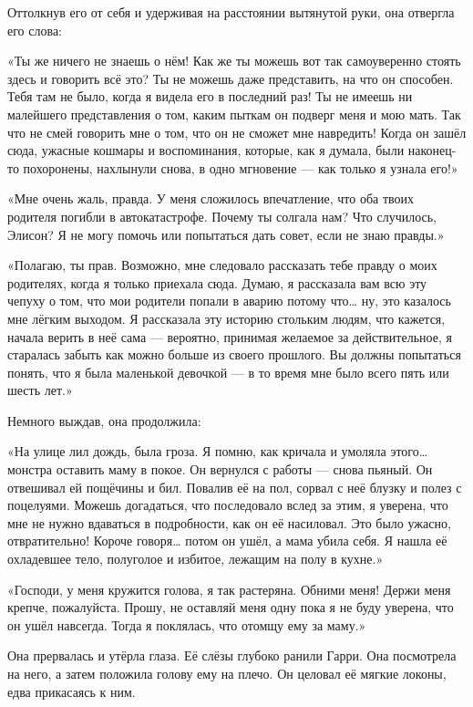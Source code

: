 \documentclass[a4paper,12pt]{book}
\begin{document}
\par
Оттолкнув его от себя и удерживая на расстоянии вытянутой руки, она отвергла его слова:
\par
«Ты же ничего не знаешь о нём! Как же ты можешь вот так самоуверенно стоять здесь и говорить всё это? Ты не можешь даже представить, на что он способен. Тебя там не было, когда я видела его в последний раз! Ты не имеешь ни малейшего представления о том, каким пыткам он подверг меня и мою мать. Так что не смей говорить мне о том, что он не сможет мне навредить! Когда он зашёл сюда, ужасные кошмары и воспоминания, которые, как я думала, были наконец-то похоронены, нахлынули снова, в одно мгновение — как только я узнала его!»
\par
«Мне очень жаль, правда. У меня сложилось впечатление, что оба твоих родителя погибли в автокатастрофе. Почему ты солгала нам? Что случилось, Элисон? Я не могу помочь или попытаться дать совет, если не знаю правды.»
\par
«Полагаю, ты прав. Возможно, мне следовало рассказать тебе правду о моих родителях, когда я только приехала сюда. Думаю, я рассказала вам всю эту чепуху о том, что мои родители попали в аварию потому что… ну, это казалось мне лёгким выходом. Я рассказала эту историю стольким людям, что кажется, начала верить в неё сама — вероятно, принимая желаемое за действительное, я старалась забыть как можно больше из своего прошлого. Вы должны попытаться понять, что я была маленькой девочкой — в то время мне было всего пять или шесть лет.»
\par
Немного выждав, она продолжила:
\par
«На улице лил дождь, была гроза. Я помню, как кричала и умоляла этого… монстра оставить маму в покое. Он вернулся с работы — снова пьяный. Он отвешивал ей пощёчины и бил. Повалив её на пол, сорвал с неё блузку и полез с поцелуями. Можешь догадаться, что последовало вслед за этим, я уверена, что мне не нужно вдаваться в подробности, как он её насиловал. Это было ужасно, отвратительно! Короче говоря… потом он ушёл, а мама убила себя. Я нашла её охладевшее тело, полуголое и избитое, лежащим на полу в кухне.»
\par
«Господи, у меня кружится голова, я так растеряна. Обними меня! Держи меня крепче, пожалуйста. Прошу, не оставляй меня одну пока я не буду уверена, что он ушёл навсегда. Тогда я поклялась, что отомщу ему за маму.»
\par
Она прервалась и утёрла глаза. Её слёзы глубоко ранили Гарри. Она посмотрела на него, а затем положила голову ему на плечо. Он целовал её мягкие локоны, едва прикасаясь к ним.
\end{document}
